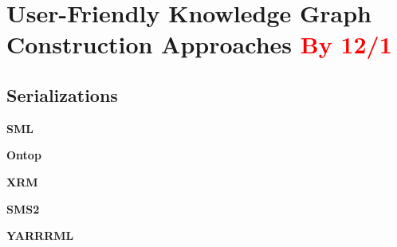 \section{User-Friendly Knowledge Graph Construction Approaches \textcolor{red}{By 12/1}}
\label{sec:chp2_easy_kgc}


\subsection{Serializations}

\noindent\textbf{SML}~\parencite{Stadler2015sml}

\noindent\textbf{Ontop}~\parencite{rodriguez2015efficient}

\noindent\textbf{XRM}~\parencite{xrm}

\noindent\textbf{SMS2}~\parencite{sms2}

\noindent\textbf{YARRRML}~\parencite{Heyvaert2018yarrrml}

